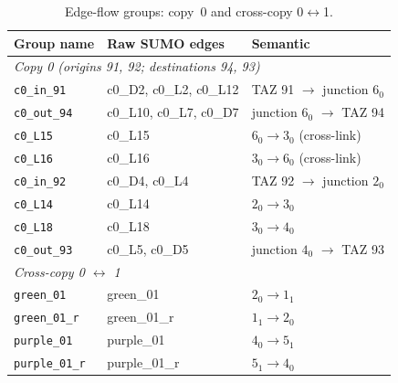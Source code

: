 \documentclass[11pt]{article}
\begin{document}
\begin{table}[h]
\centering
\caption{Edge-flow groups: copy~0 and cross-copy 0$\leftrightarrow$1.}
\label{tab:groups_grid3_c0}
\begin{tabular}{lll}
\hline
\textbf{Group name} & \textbf{Raw SUMO edges} & \textbf{Semantic} \\
\hline
\multicolumn{3}{l}{\textit{Copy 0 (origins 91, 92; destinations 94, 93)}} \\
\texttt{c0\_in\_91}  & c0\_D2, c0\_L2, c0\_L12  & TAZ 91 $\to$ junction $6_0$ \\
\texttt{c0\_out\_94} & c0\_L10, c0\_L7, c0\_D7  & junction $6_0$ $\to$ TAZ 94 \\
\texttt{c0\_L15}     & c0\_L15                  & $6_0 \to 3_0$ (cross-link) \\
\texttt{c0\_L16}     & c0\_L16                  & $3_0 \to 6_0$ (cross-link) \\
\texttt{c0\_in\_92}  & c0\_D4, c0\_L4           & TAZ 92 $\to$ junction $2_0$ \\
\texttt{c0\_L14}     & c0\_L14                  & $2_0 \to 3_0$ \\
\texttt{c0\_L18}     & c0\_L18                  & $3_0 \to 4_0$ \\
\texttt{c0\_out\_93} & c0\_L5, c0\_D5           & junction $4_0$ $\to$ TAZ 93 \\
\hline
\multicolumn{3}{l}{\textit{Cross-copy 0 $\leftrightarrow$ 1}} \\
\texttt{green\_01}   & green\_01                & $2_0 \to 1_1$ \\
\texttt{green\_01\_r}& green\_01\_r             & $1_1 \to 2_0$ \\
\texttt{purple\_01}  & purple\_01               & $4_0 \to 5_1$ \\
\texttt{purple\_01\_r}& purple\_01\_r           & $5_1 \to 4_0$ \\
\hline
\end{tabular}
\end{table}
\end{document}
